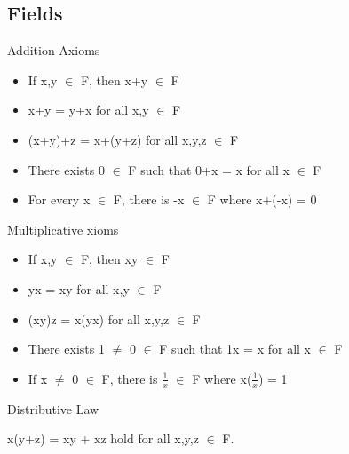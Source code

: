 \subsection{Fields}

Addition Axioms
	\begin{itemize}[leftmargin=1cm, itemsep=0.4em]
		\item If x,y $\in$ F, then x+y $\in$ F
	
		\item x+y = y+x for all x,y $\in$ F
	
		\item (x+y)+z = x+(y+z) for all x,y,z $\in$ F
	
		\item There exists 0 $\in$ F such that 0+x = x for all x $\in$ F
	
		\item For every x $\in$ F, there is -x $\in$ F where x+(-x) = 0
	\end{itemize}

Multiplicative xioms
	\begin{itemize}[leftmargin=1cm, itemsep=0.4em]
		\item If x,y $\in$ F, then xy $\in$ F
	
		\item yx = xy for all x,y $\in$ F
	
		\item (xy)z = x(yx) for all x,y,z $\in$ F
	
		\item There exists 1 $\not =$ 0 $\in$ F such that 1x = x for all x $\in$ F
	
		\item If x $\not =$ 0 $\in$ F, there is $\frac{1}{x}$ $\in$ F where x($\frac{1}{x}$) = 1
	\end{itemize}

Distributive Law

	\qquad x(y+z) = xy + xz hold for all x,y,z $\in$ F. \\


